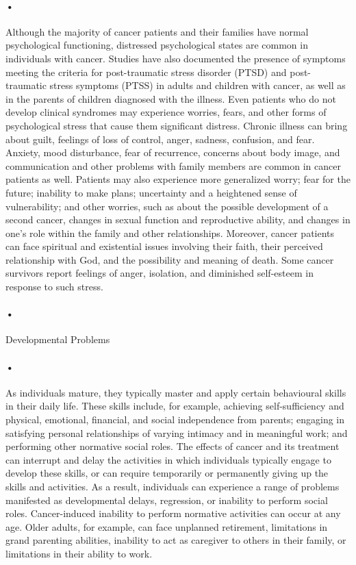 \documentclass[12pt]{article}
\begin{document}
\paragraph{•}Although the majority of cancer patients and their families have normal psychological functioning, distressed psychological states are common in individuals with cancer. Studies have also documented the presence of symptoms meeting the criteria for post-traumatic stress disorder (PTSD) and post-traumatic stress symptoms (PTSS) in adults and children with cancer, as well as in the parents of children diagnosed with the illness. Even patients who do not develop clinical syndromes may experience worries, fears, and other forms of psychological stress that cause them significant distress. Chronic illness can bring about guilt, feelings of loss of control, anger, sadness, confusion, and fear. Anxiety, mood disturbance, fear of recurrence, concerns about body image, and communication and other problems with family members are common in cancer patients as well. Patients may also experience more generalized worry; fear for the future; inability to make plans; uncertainty and a heightened sense of vulnerability; and other worries, such as about the possible development of a second cancer, changes in sexual function and reproductive ability, and changes in one’s role within the family and other relationships. Moreover, cancer patients can face spiritual and existential issues involving their faith, their perceived relationship with God, and the possibility and meaning of death. Some cancer survivors report feelings of anger, isolation, and diminished self-esteem in response to such stress.

\paragraph{•}Developmental Problems
\paragraph{•}As individuals mature, they typically master and apply certain behavioural skills in their daily life. These skills include, for example, achieving self-sufficiency and physical, emotional, financial, and social independence from parents; engaging in satisfying personal relationships of varying intimacy and in meaningful work; and performing other normative social roles. The effects of cancer and its treatment can interrupt and delay the activities in which individuals typically engage to develop these skills, or can require temporarily or permanently giving up the skills and activities. As a result, individuals can experience a range of problems manifested as developmental delays, regression, or inability to perform social roles. Cancer-induced inability to perform normative activities can occur at any age. Older adults, for example, can face unplanned retirement, limitations in grand parenting abilities, inability to act as caregiver to others in their family, or limitations in their ability to work.
\end{document}
